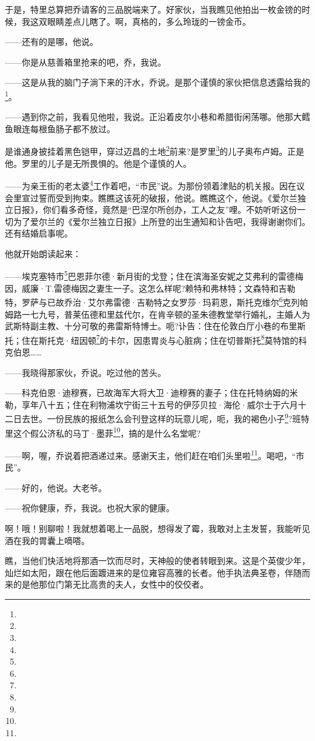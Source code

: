 \par 于是，特里总算把乔请客的三品脱端来了。好家伙，当我瞧见他拍出一枚金镑的时候，我这双眼睛差点儿瞎了。啊，真格的，多么玲珑的一镑金币。
\par ——还有的是哪，他说。
\par ——你是从慈善箱里抢来的吧，乔，我说。
\par ——这是从我的脑门子淌下来的汗水，乔说。是那个谨慎的家伙把信息透露给我的\footnote{}。
\par ——遇到你之前，我看见他啦，我说。正沿着皮尔小巷和希腊街闲荡哪。他那大鳕鱼眼连每根鱼肠子都不放过。
\par 是谁通身披挂着黑色铠甲，穿过迈昌的土地\footnote{}前来?是罗里\footnote{}的儿子奥布卢姆。正是他。罗里的儿子是无所畏惧的。他是个谨慎的人。
\par ——为亲王街的老太婆\footnote{}工作着吧，“市民”说。为那份领着津贴的机关报。因在议会里宣过誓而受到拘束。瞧瞧这该死的破报，他说。瞧瞧这个，他说。《爱尔兰独立日报》，你们看多奇怪，竟然是“巴涅尔所创办，工人之友”哩。不妨听听这份一切为了爱尔兰的《爱尔兰独立日报》上所登的出生通知和讣告吧，我得谢谢你们。还有结婚启事呢。
\par 他就开始朗读起来：
\par ——埃克塞特市\footnote{}巴恩菲尔德·新月街的戈登；住在滨海圣安妮之艾弗利的雷德梅因，威廉·T.雷德梅因之妻生一子。这怎么样呢?赖特和弗林特；文森特和吉勒特，罗萨与已故乔治·艾尔弗雷德·吉勒特之女罗莎·玛莉恩，斯托克维尔\footnote{}克列帕姆路一七九号，普莱伍德和里兹代尔，在肯辛顿的圣朱德教堂举行婚礼，主婚人为武斯特副主教、十分可敬的弗雷斯特博士。呃?讣告：住在伦敦白厅小巷的布里斯托；住在斯托克·纽因顿\footnote{}的卡尔，因患胃炎与心脏病；住在切普斯托\footnote{}莫特馆的科克伯恩……
\par ——我晓得那家伙，乔说。吃过他的苦头。
\par ——科克伯恩·迪穆赛，已故海军大将大卫·迪穆赛的妻子；住在托特纳姆的米勒，享年八十五；住在利物浦坎宁街三十五号的伊莎贝拉·海伦·威尔士于六月十二日去世。一份民族的报纸怎么会刊登这样的玩意儿呢，呃，我的褐色小子\footnote{}?班特里这个假公济私的马丁·墨菲\footnote{}，搞的是什么名堂呢?
\par ——啊，喔，乔说着把酒递过来。感谢天主，他们赶在咱们头里啦\footnote{}。喝吧，“市民”。
\par ——好的，他说。大老爷。
\par ——祝你健康，乔，我说。也祝大家的健康。
\par 啊！哦！别聊啦！我就想着喝上一品脱，想得发了霉，我敢对上主发誓，我能听见酒在我的胃囊上嘀嗒。
\par 瞧，当他们快活地将那酒一饮而尽时，天神般的使者转眼到来。这是个英俊少年，灿烂如太阳，跟在他后面踱进来的是位雍容高雅的长者。他手执法典圣卷，伴随而来的是他那位门第无比高贵的夫人，女性中的佼佼者。
